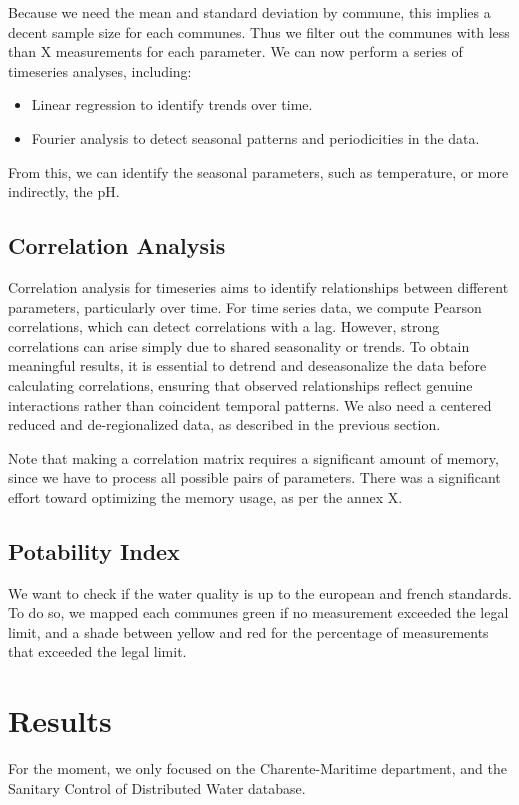 \documentclass{article}
\begin{document}
Because we need the mean and standard deviation by commune, this implies a decent sample size for each communes.
Thus we filter out the communes with less than X measurements for each parameter.
We can now perform a series of timeseries analyses, including:
\begin{itemize}
    \item Linear regression to identify trends over time.
    \item Fourier analysis to detect seasonal patterns and periodicities in the data.
\end{itemize}

From this, we can identify the seasonal parameters, such as temperature, or more indirectly, the pH.

\subsection{Correlation Analysis}
Correlation analysis for timeseries aims to identify relationships between different parameters, 
particularly over time. For time series data, we compute Pearson correlations, which can detect correlations with a lag.
However, strong correlations can arise simply due to shared seasonality or trends. 
To obtain meaningful results, it is essential to detrend and deseasonalize 
the data before calculating correlations, ensuring that observed relationships 
reflect genuine interactions rather than coincident temporal patterns.
We also need a centered reduced and de-regionalized data, as described in the previous section.

Note that making a correlation matrix requires a significant amount of memory,
since we have to process all possible pairs of parameters.
There was a significant effort toward optimizing the memory usage, as per the annex X.

\subsection{Potability Index}
We want to check if the water quality is up to the european and french standards.
To do so, we mapped each communes green if no measurement exceeded the legal limit, 
and a shade between yellow and red for the percentage of measurements that exceeded the legal limit.

\section{Results}
For the moment, we only focused on the Charente-Maritime department, and the Sanitary Control of Distributed Water database.
\end{document}
